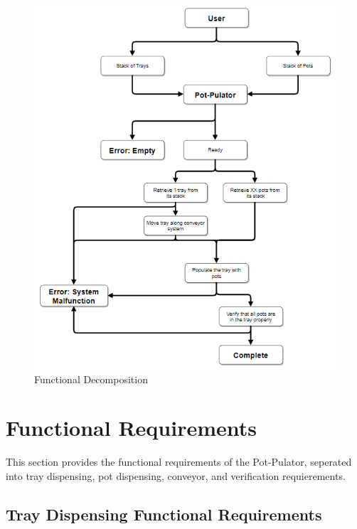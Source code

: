 \documentclass[12pt]{article}
\begin{document}
\begin{figure}[H]
  \includegraphics[width=15cm]{functionalDiagram.PNG}
  \caption{Functional Decomposition}
  \label{fig:functional1}
\end{figure}

  \section{Functional Requirements}

  This section provides the functional requirements of the Pot-Pulator, seperated into tray dispensing,
  pot dispensing, conveyor, and verification requierements.
 
  \subsection{Tray Dispensing Functional Requirements}
  
\end{document}
